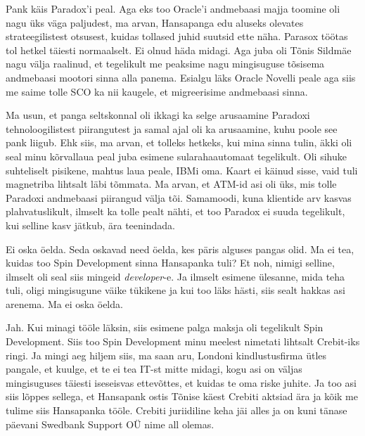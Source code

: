 
Pank käis Paradox'i peal. Aga eks too Oracle'i andmebaasi majja 
toomine oli nagu üks väga paljudest, ma arvan,  Hansapanga edu aluseks olevates 
strateegilistest otsusest, kuidas tollased juhid suutsid ette näha. Parasox 
töötas tol hetkel täiesti normaalselt. Ei olnud häda midagi. Aga juba oli Tõnis 
Sildmäe nagu välja raalinud, et tegelikult me 
peaksime nagu mingisuguse tõsisema andmebaasi mootori sinna alla panema. 
Esialgu läks Oracle Novelli peale  aga siis me saime tolle SCO ka 
nii kaugele, et migreerisime andmebaasi sinna.


Ma usun,  et panga seltskonnal oli ikkagi ka selge arusaamine Paradoxi 
tehnoloogilistest piirangutest ja samal ajal oli ka arusaamine, kuhu poole see 
pank liigub. Ehk siis, ma arvan, et tolleks hetkeks, kui mina sinna tulin, äkki 
oli seal minu kõrvallaua peal juba esimene sularahaautomaat tegelikult.  Oli 
sihuke suhteliselt pisikene,  mahtus laua peale, IBMi oma. Kaart ei käinud 
sisse, vaid tuli magnetriba lihtsalt läbi tõmmata. Ma arvan, et ATM-id asi oli 
üks, mis  tolle Paradoxi andmebaasi piirangud välja tõi. Samamoodi, kuna 
klientide arv kasvas plahvatuslikult, ilmselt ka tolle pealt nähti, et too 
Paradox ei suuda tegelikult, kui selline kasv jätkub, ära teenindada.


Ei oska öelda. Seda oskavad need öelda, kes päris alguses pangas olid. Ma ei 
tea, kuidas too Spin Development sinna Hansapanka tuli? 
Et noh, nimigi selline,  ilmselt oli seal siis mingeid \emph{developer}-e. Ja 
ilmselt esimene ülesanne, mida teha tuli, oligi mingisugune väike tükikene ja 
kui too läks hästi, siis sealt hakkas asi arenema. Ma ei oska öelda.


Jah. Kui minagi tööle läksin, siis esimene palga maksja oli tegelikult Spin 
Development. Siis too Spin Development minu meelest nimetati lihtsalt 
Crebit-iks ringi. Ja mingi aeg hiljem siis, ma saan aru, Londoni 
kindlustusfirma ütles pangale, et kuulge, et te ei tea IT-st mitte midagi, kogu 
asi on väljas mingisuguses täiesti iseseisvas ettevõttes, et kuidas te oma 
riske juhite. Ja too asi siis lõppes sellega, et Hansapank ostis Tõnise käest 
Crebiti aktsiad ära ja kõik me tulime siis Hansapanka tööle. Crebiti 
juriidiline keha jäi alles ja on kuni tänase päevani Swedbank Support OÜ nime 
all olemas.

